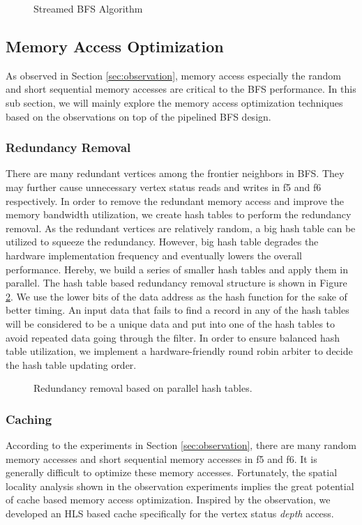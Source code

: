 \begin{figure}
\caption{Streamed BFS Algorithm}
\label{fig:bfs-stream}
\end{figure}

\subsection{Memory Access Optimization}
As observed in Section \ref{sec:observation}, memory access especially the random and 
short sequential memory accesses are critical to the 
BFS performance. In this sub section, we will mainly explore the memory 
access optimization techniques based on the observations on top of 
the pipelined BFS design.

\subsubsection{Redundancy Removal}
There are many redundant vertices among the frontier neighbors in BFS. 
They may further cause unnecessary vertex status reads and writes in 
f5 and f6 respectively. In order to remove the redundant memory access 
and improve the memory bandwidth utilization, we create hash tables 
to perform the redundancy removal. As the redundant vertices are 
relatively random, a big hash table can be utilized to squeeze 
the redundancy. However, big hash table degrades the hardware implementation 
frequency and eventually lowers the overall performance. Hereby, we 
build a series of smaller hash tables and apply them in parallel. 
The hash table based redundancy removal structure is shown in Figure \ref{fig:hash-strategy}. 
We use the lower bits of the data address as the hash function 
for the sake of better timing. An input data that fails to find a 
record in any of the hash tables will be considered to be a unique 
data and put into one of the hash tables to avoid repeated data 
going through the filter. In order to ensure balanced hash 
table utilization, we implement a hardware-friendly round robin 
arbiter to decide the hash table updating order. 
  
\begin{figure}
    \caption{Redundancy removal based on parallel hash tables.}
\label{fig:hash-strategy}
\end{figure}

\subsubsection{Caching}
According to the experiments in Section \ref{sec:observation}, 
there are many random memory accesses and short 
sequential memory accesses in f5 and f6. 
It is generally difficult to optimize these memory accesses. Fortunately, 
the spatial locality analysis shown in the observation experiments 
implies the great potential of cache based memory access optimization. 
Inspired by the observation, we developed an HLS based cache specifically 
for the vertex status \textit{depth} access. 

